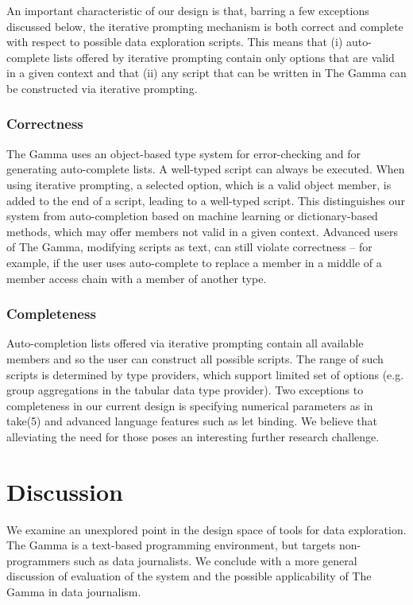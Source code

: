 \documentclass[manuscript,review,anonymous]{acmart}
\newcommand{\ikvd}[1]{{\fontfamily{zi4}\selectfont\small #1}}
\begin{document}
An important characteristic of our design is that, barring a few exceptions discussed below, the iterative
prompting mechanism is both correct and complete with respect to possible data exploration scripts.
This means that (i) auto-complete lists offered by iterative prompting contain
only options that are valid in a given context and that (ii) any script that can be written
in The Gamma can be constructed via iterative prompting.

\subsubsection*{Correctness} The Gamma uses an object-based type system for error-checking and for
generating auto-complete lists. A well-typed script can always be executed. When using iterative
prompting, a selected option, which is a valid object member, is added to the end of a script,
leading to a well-typed script. This distinguishes our system from auto-completion based on machine
learning or dictionary-based methods, which may offer members not valid in a given context. Advanced
users of The Gamma, modifying scripts as text, can still violate correctness -- for example, if the
user uses auto-complete to replace a member in a middle of a member access chain with a member of another type.

\subsubsection*{Completeness} Auto-completion lists offered via iterative prompting contain
all available members and so the user can construct all possible scripts. The range of such scripts
is determined by type providers, which support limited set of options (e.g. group aggregations in
the tabular data type provider). Two exceptions to completeness in our current design is specifying
numerical parameters as in \ikvd{take(5)} and advanced language features such as let binding.
We believe that alleviating the need for those poses an interesting further research challenge.


\section{Discussion}
We examine an unexplored point in the design space of tools for data exploration. The Gamma is a
text-based programming environment, but targets non-programmers such as data journalists. We
conclude with a more general discussion of evaluation of the system and the possible applicability
of The Gamma in data journalism.
\end{document}
